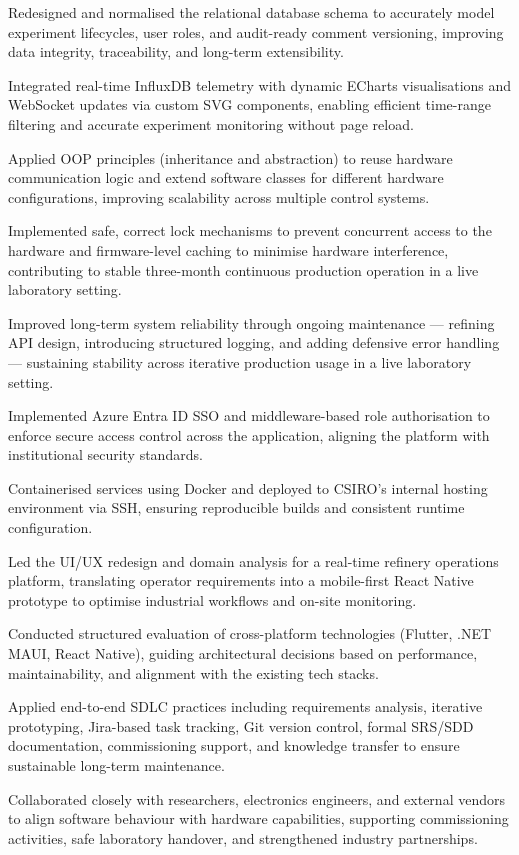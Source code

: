 \documentclass[letterpaper,11pt]{article}
\newcommand{\resumeItem}[1]{
  \item\small #1
}
\begin{document}
            \resumeItem{Redesigned and normalised the relational database schema to accurately model experiment lifecycles, user roles, and audit-ready comment versioning, improving data integrity, traceability, and long-term extensibility.}
            \resumeItem{Integrated real-time InfluxDB telemetry with dynamic ECharts visualisations and WebSocket updates via custom SVG components, enabling efficient time-range filtering and accurate experiment monitoring without page reload.}
            \resumeItem{Applied OOP principles (inheritance and abstraction) to reuse hardware communication logic and extend software classes for different hardware configurations, improving scalability across multiple control systems.}
            \resumeItem{Implemented safe, correct lock mechanisms to prevent concurrent access to the hardware and firmware-level caching to minimise hardware interference, contributing to stable three-month continuous production operation in a live laboratory setting.}
            \resumeItem{Improved long-term system reliability through ongoing maintenance — refining API design, introducing structured logging, and adding defensive error handling — sustaining stability across iterative production usage in a live laboratory setting.}
            \resumeItem{Implemented Azure Entra ID SSO and middleware-based role authorisation to enforce secure access control across the application, aligning the platform with institutional security standards.}
            \resumeItem{Containerised services using Docker and deployed to CSIRO's internal hosting environment via SSH, ensuring reproducible builds and consistent runtime configuration.}
            \resumeItem{Led the UI/UX redesign and domain analysis for a real-time refinery operations platform, translating operator requirements into a mobile-first React Native prototype to optimise industrial workflows and on-site monitoring.}
            \resumeItem{Conducted structured evaluation of cross-platform technologies (Flutter, .NET MAUI, React Native), guiding architectural decisions based on performance, maintainability, and alignment with the existing tech stacks.}
            \resumeItem{Applied end-to-end SDLC practices including requirements analysis, iterative prototyping, Jira-based task tracking, Git version control, formal SRS/SDD documentation, commissioning support, and knowledge transfer to ensure sustainable long-term maintenance.}
            \resumeItem{Collaborated closely with researchers, electronics engineers, and external vendors to align software behaviour with hardware capabilities, supporting commissioning activities, safe laboratory handover, and strengthened industry partnerships.}
\end{document}
